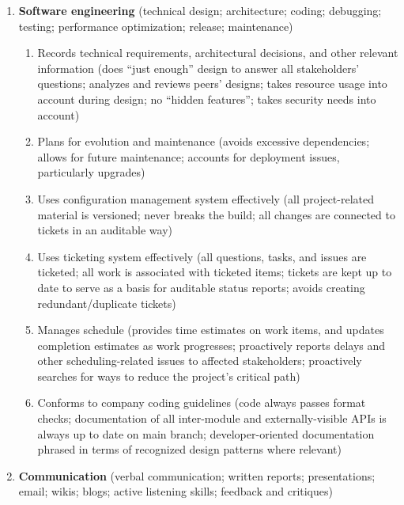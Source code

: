 \documentclass{report}
\begin{document}
\begin{enumerate}

\item \textbf{Software engineering} (technical design; architecture;
coding; debugging; testing; performance optimization; release;
maintenance)

  \begin{enumerate}

  \item Records technical requirements, architectural decisions, and
  other relevant information (does ``just enough'' design to answer
  all stakeholders' questions; analyzes and reviews peers' designs;
  takes resource usage into account during design; no ``hidden
  features''; takes security needs into account)

  \item Plans for evolution and maintenance (avoids excessive
  dependencies; allows for future maintenance; accounts for deployment
  issues, particularly upgrades)

  \item Uses configuration management system effectively (all
  project-related material is versioned; never breaks the build; all
  changes are connected to tickets in an auditable way)

  \item Uses ticketing system effectively (all questions, tasks, and
  issues are ticketed; all work is associated with ticketed items;
  tickets are kept up to date to serve as a basis for auditable status
  reports; avoids creating redundant/duplicate tickets)

  \item Manages schedule (provides time estimates on work items, and
  updates completion estimates as work progresses; proactively reports
  delays and other scheduling-related issues to affected stakeholders;
  proactively searches for ways to reduce the project's critical path)

  \item Conforms to company coding guidelines (code always passes
  format checks; documentation of all inter-module and
  externally-visible APIs is always up to date on main branch;
  developer-oriented documentation phrased in terms of recognized
  design patterns where relevant)

  \end{enumerate}

\item \textbf{Communication} (verbal communication; written reports;
presentations; email; wikis; blogs; active listening skills; feedback
and critiques)


\end{enumerate}
\end{document}
